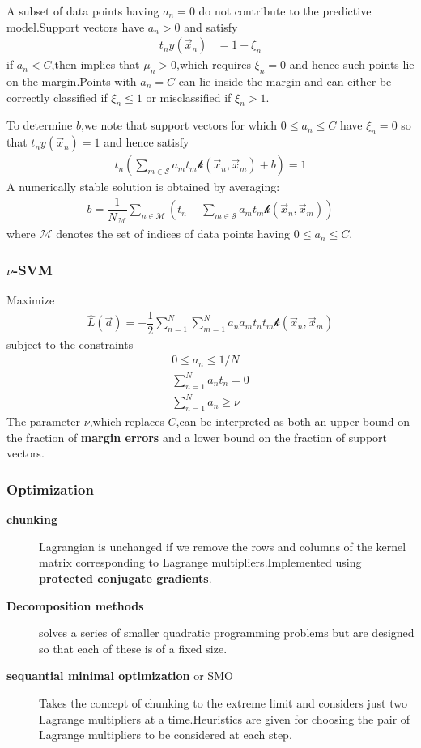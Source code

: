 A subset of data points having $a_n =0$ do not contribute to the predictive model.Support vectors have $a_n > 0$ and satisfy
\begin{align}
t_n y(\vec{x}_n) &= 1-\xi_n
\end{align}
if $a_n <C$,then implies that $\mu_n > 0$,which requires $\xi_n =0$ and hence such points lie on the margin.Points with $a_n=C$ can lie inside the margin and can either be correctly classified if $\xi_n \leq 1$ or misclassified if $\xi_n >1$.

To determine $b$,we note that support vectors for which $0\leq a_n \leq C$ have $\xi_n =0$ so that $t_n y(\vec{x}_n)=1$ and hence satisfy
\begin{align}
t_n(\sum_{m\in\mathcal{S}}a_m t_m \mathcal{k}(\vec{x}_n,\vec{x}_m)+b) =1
\end{align}
A numerically stable solution is obtained by averaging:
\begin{align}
	b=\dfrac{1}{N_{\mathcal{M}}}\sum_{n\in\mathcal{M}} (t_n - \sum_{m\in\mathcal{S}}a_m t_m \mathcal{k}(\vec{x}_n,\vec{x}_m))
\end{align}
where $\mathcal{M}$ denotes the set of indices of data points having $0\leq a_n \leq C$.

\subsubsection{$\nu$-SVM}
Maximize
\begin{align}
\hat{L}(\vec{a})=-\dfrac{1}{2}\sum_{n=1}^{N}\sum_{m=1}^{N}a_n a_m t_n t_m\mathcal{k}(\vec{x}_n,\vec{x}_m)
\end{align}
subject to the constraints
\begin{align}
0\leq a_n \leq 1/N\\
\sum_{n=1}^{N}a_n t_n = 0 \\
\sum_{n=1}^{N}a_n \geq \nu
\end{align}
The parameter $\nu$,which replaces $C$,can be interpreted as both an upper bound on the fraction of \textbf{margin errors} and a lower bound on the fraction of support vectors.

\subsubsection{Optimization}
\begin{description}
	\item[\textbf{chunking}]Lagrangian is unchanged if we remove the rows and columns of the kernel matrix corresponding to Lagrange multipliers.Implemented using \textbf{protected conjugate gradients}.
	\item[\textbf{Decomposition methods}] solves a series of smaller quadratic programming problems but are designed so that each of these is of a fixed size.
	\item[\textbf{sequantial minimal optimization} or SMO] Takes the concept of chunking to the extreme limit and considers just two Lagrange multipliers at a time.Heuristics are given for choosing the pair of Lagrange multipliers to be considered at each step.
\end{description}

